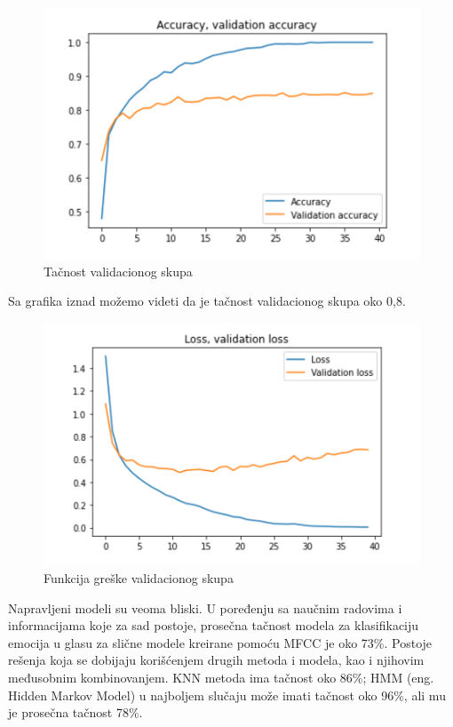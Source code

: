 \documentclass{article}
\begin{document}
\begin{figure}[h]
\centering
\includegraphics[scale=0.5]{val_acc.png}
\caption{Tačnost validacionog skupa}
\end{figure}

Sa grafika iznad možemo videti da je tačnost validacionog skupa oko 0,8. 
\newpage
\begin{figure}[h]
\centering
\includegraphics[scale=0.5]{val_loss.png}
\caption{Funkcija greške validacionog skupa}
\end{figure}
 
Napravljeni modeli su veoma bliski. U poređenju sa naučnim radovima i informacijama koje za sad postoje, prosečna tačnost modela za klasifikaciju emocija u glasu za slične modele kreirane pomoću MFCC je oko 73\%. 
Postoje rešenja koja se dobijaju korišćenjem drugih metoda i modela, kao i njihovim međusobnim kombinovanjem. KNN metoda ima tačnost oko 86\%; HMM (eng. Hidden Markov Model) u najboljem slučaju može imati tačnost oko 96\%, ali mu je prosečna tačnost 78\%.
\end{document}
